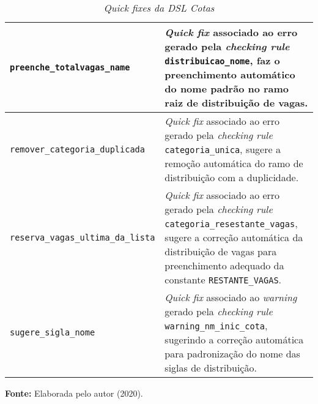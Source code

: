 \begin{table}[ht]
\caption{\textit{Quick fixes da DSL Cotas}}
\label{tblquickfixes}
\centering

\begin{tabular}{|p{6cm}|p{9cm}|}
\hline
\texttt{preenche\_totalvagas\_name} & \textit{Quick fix} associado ao erro gerado pela \textit{checking rule} \texttt{distribuicao\_nome}, faz o preenchimento automático do nome padrão no ramo raiz de distribuição de vagas.                                                                                      \\ \hline
\texttt{remover\_categoria\_duplicada} & \textit{Quick fix} associado ao erro gerado pela \textit{checking rule} \texttt{categoria\_unica}, sugere a remoção automática do ramo de distribuição com a duplicidade.

\\ \hline
\texttt{reserva\_vagas\_ultima\_da\_lista} & \textit{Quick fix} associado ao erro gerado pela \textit{checking rule} \texttt{categoria\_resestante\_vagas}, sugere a correção automática da distribuição de vagas para preenchimento adequado da constante \texttt{RESTANTE\_VAGAS}.

\\ \hline
\texttt{sugere\_sigla\_nome} & \textit{Quick fix} associado ao \textit{warning} gerado pela \textit{checking rule} \texttt{warning\_nm\_inic\_cota}, sugerindo a correção automática para padronização do nome das siglas de distribuição.
                  \\ \hline      

\end{tabular}

  \par\medskip\textbf{Fonte:} Elaborada pelo autor (2020). \par\medskip
\end{table}

